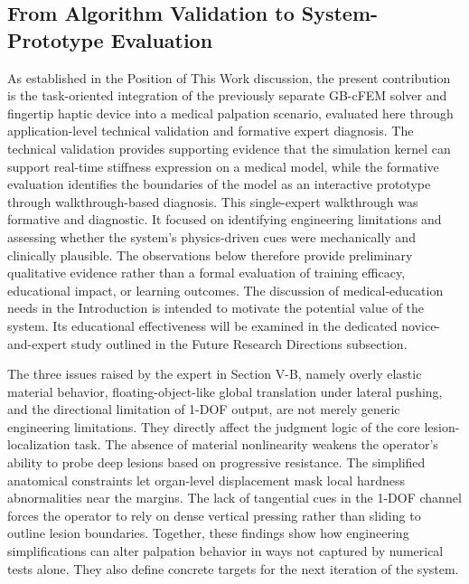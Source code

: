 \documentclass{ieeeaccess}
\begin{document}
\subsection{From Algorithm Validation to System-Prototype Evaluation}
As established in the Position of This Work discussion, the present contribution is the task-oriented integration of the previously separate GB-cFEM solver and fingertip haptic device into a medical palpation scenario, evaluated here through application-level technical validation and formative expert diagnosis. The technical validation provides supporting evidence that the simulation kernel can support real-time stiffness expression on a medical model, while the formative evaluation identifies the boundaries of the model as an interactive prototype through walkthrough-based diagnosis.
This single-expert walkthrough was formative and diagnostic. It focused on identifying engineering limitations and assessing whether the system’s physics-driven cues were mechanically and clinically plausible. The observations below therefore provide preliminary qualitative evidence rather than a formal evaluation of training efficacy, educational impact, or learning outcomes. The discussion of medical-education needs in the Introduction is intended to motivate the potential value of the system. Its educational effectiveness will be examined in the dedicated novice-and-expert study outlined in the Future Research Directions subsection.

The three issues raised by the expert in Section V-B, namely overly elastic material behavior, floating-object-like global translation under lateral pushing, and the directional limitation of 1-DOF output, are not merely generic engineering limitations. They directly affect the judgment logic of the core lesion-localization task. The absence of material nonlinearity weakens the operator's ability to probe deep lesions based on progressive resistance. The simplified anatomical constraints let organ-level displacement mask local hardness abnormalities near the margins. The lack of tangential cues in the 1-DOF channel forces the operator to rely on dense vertical pressing rather than sliding to outline lesion boundaries. Together, these findings show how engineering simplifications can alter palpation behavior in ways not captured by numerical tests alone. They also define concrete targets for the next iteration of the system.
\end{document}
